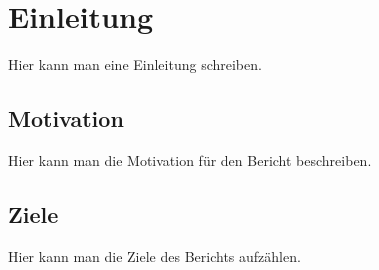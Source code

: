 \section{Einleitung}
Hier kann man eine Einleitung schreiben.

\subsection{Motivation}
Hier kann man die Motivation für den Bericht beschreiben.

\subsection{Ziele}
Hier kann man die Ziele des Berichts aufzählen.